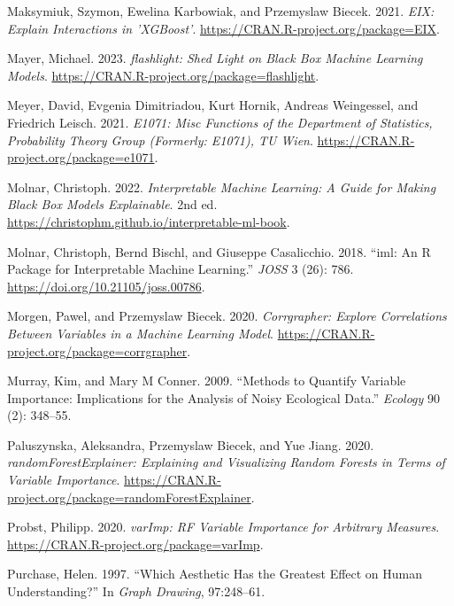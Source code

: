 \begin{CSLReferences}{1}{0}
\leavevmode{}%
Maksymiuk, Szymon, Ewelina Karbowiak, and Przemyslaw Biecek. 2021. \emph{EIX: Explain Interactions in 'XGBoost'}. \url{https://CRAN.R-project.org/package=EIX}.

\leavevmode{}%
Mayer, Michael. 2023. \emph{{flashlight}: Shed Light on Black Box Machine Learning Models}. \url{https://CRAN.R-project.org/package=flashlight}.

\leavevmode{}%
Meyer, David, Evgenia Dimitriadou, Kurt Hornik, Andreas Weingessel, and Friedrich Leisch. 2021. \emph{E1071: Misc Functions of the Department of Statistics, Probability Theory Group (Formerly: E1071), TU Wien}. \url{https://CRAN.R-project.org/package=e1071}.

\leavevmode{}%
Molnar, Christoph. 2022. \emph{Interpretable Machine Learning: A Guide for Making Black Box Models Explainable}. 2nd ed. \url{https://christophm.github.io/interpretable-ml-book}.

\leavevmode{}%
Molnar, Christoph, Bernd Bischl, and Giuseppe Casalicchio. 2018. {``{iml}: An {R} Package for Interpretable Machine Learning.''} \emph{JOSS} 3 (26): 786. \url{https://doi.org/10.21105/joss.00786}.

\leavevmode{}%
Morgen, Pawel, and Przemyslaw Biecek. 2020. \emph{Corrgrapher: Explore Correlations Between Variables in a Machine Learning Model}. \url{https://CRAN.R-project.org/package=corrgrapher}.

\leavevmode{}%
Murray, Kim, and Mary M Conner. 2009. {``Methods to Quantify Variable Importance: Implications for the Analysis of Noisy Ecological Data.''} \emph{Ecology} 90 (2): 348--55.

\leavevmode{}%
Paluszynska, Aleksandra, Przemyslaw Biecek, and Yue Jiang. 2020. \emph{randomForestExplainer: Explaining and Visualizing Random Forests in Terms of Variable Importance}. \url{https://CRAN.R-project.org/package=randomForestExplainer}.

\leavevmode{}%
Probst, Philipp. 2020. \emph{varImp: {RF} {V}ariable {I}mportance for {A}rbitrary {M}easures}. \url{https://CRAN.R-project.org/package=varImp}.

\leavevmode{}%
Purchase, Helen. 1997. {``Which Aesthetic Has the Greatest Effect on Human Understanding?''} In \emph{Graph Drawing}, 97:248--61.


\end{CSLReferences}
